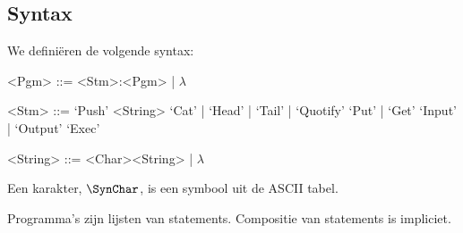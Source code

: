 \subsection{Syntax}
\label{sec:def:syn}

We definiëren de volgende syntax:

\setlength{\grammarindent}{5em}
\begin{grammar}
	<Pgm> ::= <Stm>:<Pgm> | $\lambda$

	<Stm> ::= `Push' <String>
		\alt `Cat' | `Head' | `Tail' | `Quotify'
		\alt `Put' | `Get'
		\alt `Input' | `Output'
		\alt `Exec'

	<String> ::= <Char><String> | $\lambda$
\end{grammar}

Een karakter, $\SynChar$, is een symbool uit de ASCII tabel. 

Programma's zijn lijsten van statements. Compositie van statements is
impliciet.

